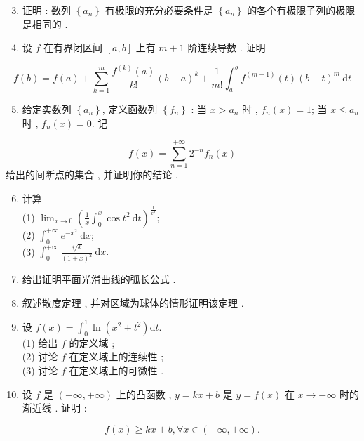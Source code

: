 \documentclass[10pt]{article}
\begin{document}
{\begin{enumerate}
  \setcounter{enumi}{2}
  \item  证明 :  数列  $\left\{a_{n}\right\}$  有极限的充分必要条件是  $\left\{a_{n}\right\}$  的各个有极限子列的极限是相同的 .

  \item  设  $f$  在有界闭区间  $[a, b]$  上有  $m+1$  阶连续导数 .  证明 

\end{enumerate}
$$
f(b)=f(a)+\sum_{k=1}^{m} \frac{f^{(k)}(a)}{k !}(b-a)^{k}+\frac{1}{m !} \int_{a}^{b} f^{(m+1)}(t)(b-t)^{m} \mathrm{~d} t
$$

\begin{enumerate}
  \setcounter{enumi}{4}
  \item  给定实数列  $\left\{a_{n}\right\}$,  定义函数列  $\left\{f_{n}\right\}$ :  当  $x>a_{n}$  时 , $f_{n}(x)=1$;  当  $x \leqslant a_{n}$  时 , $f_{n}(x)=0$.  记 
\end{enumerate}
$$
f(x)=\sum_{n=1}^{+\infty} 2^{-n} f_{n}(x)
$$
 给出的间断点的集合 ,  并证明你的结论 .

\begin{enumerate}
  \setcounter{enumi}{5}
  \item  计算 \\
(1) $\lim _{x \rightarrow 0}\left(\frac{1}{x} \int_{0}^{x} \cos t^{2} \mathrm{~d} t\right)^{\frac{1}{x^{4}}}$;\\
(2) $\int_{0}^{+\infty} e^{-x^{2}} \mathrm{~d} x$;\\
(3) $\int_{0}^{+\infty} \frac{\sqrt[4]{x}}{(1+x)^{2}} \mathrm{~d} x .$

  \item  给出证明平面光滑曲线的弧长公式 .

  \item  叙述散度定理 ,  并对区域为球体的情形证明该定理 .

  \item  设  $f(x)=\int_{0}^{1} \ln \left(x^{2}+t^{2}\right) \mathrm{d} t$.\\
(1)  给出  $f$  的定义域 ;\\
(2)  讨论  $f$  在定义域上的连续性 ;\\
(3)  讨论  $f$  在定义域上的可微性 .

  \item  设  $f$  是  $(-\infty,+\infty)$  上的凸函数 , $y=k x+b$  是  $y=f(x)$  在  $x \rightarrow-\infty$  时的渐近线 .  证明 :

\end{enumerate}
$$
f(x) \geqslant k x+b, \forall x \in(-\infty,+\infty) .
$$

}
\end{document}
